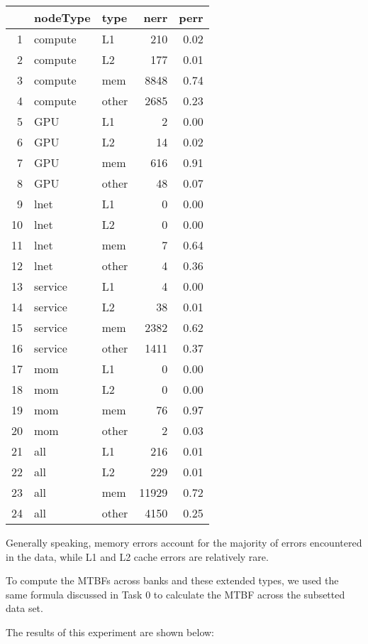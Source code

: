 \begin{table}[ht]
\centering
\begin{tabular}{rllrr}
  \hline
 & nodeType & type & nerr & perr \\ 
  \hline
1 & compute & L1 & 210 & 0.02 \\ 
  2 & compute & L2 & 177 & 0.01 \\ 
  3 & compute & mem & 8848 & 0.74 \\ 
  4 & compute & other & 2685 & 0.23 \\ 
  5 & GPU & L1 &   2 & 0.00 \\ 
  6 & GPU & L2 &  14 & 0.02 \\ 
  7 & GPU & mem & 616 & 0.91 \\ 
  8 & GPU & other &  48 & 0.07 \\ 
  9 & lnet & L1 &   0 & 0.00 \\ 
  10 & lnet & L2 &   0 & 0.00 \\ 
  11 & lnet & mem &   7 & 0.64 \\ 
  12 & lnet & other &   4 & 0.36 \\ 
  13 & service & L1 &   4 & 0.00 \\ 
  14 & service & L2 &  38 & 0.01 \\ 
  15 & service & mem & 2382 & 0.62 \\ 
  16 & service & other & 1411 & 0.37 \\ 
  17 & mom & L1 &   0 & 0.00 \\ 
  18 & mom & L2 &   0 & 0.00 \\ 
  19 & mom & mem &  76 & 0.97 \\ 
  20 & mom & other &   2 & 0.03 \\ 
  21 & all & L1 & 216 & 0.01 \\ 
  22 & all & L2 & 229 & 0.01 \\ 
  23 & all & mem & 11929 & 0.72 \\ 
  24 & all & other & 4150 & 0.25 \\ 
   \hline
\end{tabular}
\end{table}

Generally speaking, memory errors account for the majority of errors encountered in the data, while L1 and L2 cache errors are relatively rare.

To compute the MTBFs across banks and these extended types, we used the same formula discussed in Task 0 to calculate the MTBF across the subsetted data set.

The results of this experiment are shown below:

